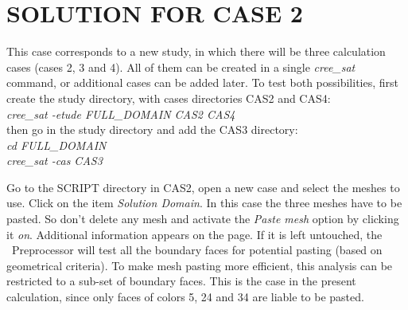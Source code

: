 %
% 
%
% 
% 
% 
%
\section{SOLUTION FOR CASE 2}
This case corresponds to a new study, in which there will be three calculation
cases (cases 2, 3 and 4). All of them can be created in a single {\itshape
cree\_sat} command, or additional cases can be added later. To test both
possibilities, first create the study directory, with cases directories CAS2
and CAS4:\\
{\itshape cree\_sat -etude FULL\_DOMAIN CAS2 CAS4}\\
then go in the study directory and add the CAS3 directory:\\
{\itshape cd FULL\_DOMAIN}\\
{\itshape cree\_sat -cas CAS3}

Go to the SCRIPT directory in CAS2,
open a new case and select the meshes to use. Click on the
item {\itshape Solution Domain}. In this case the three meshes have to be
pasted. So don't delete any mesh and activate the {\itshape Paste mesh} option by
clicking it {\itshape on}. Additional information appears on the page. If it is
left untouched, the \CS\ Preprocessor will test all the boundary faces for
potential pasting (based on geometrical criteria). To make mesh pasting more
efficient, this analysis can be restricted to a sub-set of boundary faces. This
is the case in the present calculation, since only faces of colors 5, 24 and 34
are liable to be pasted.

